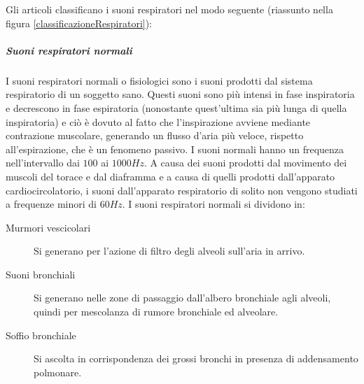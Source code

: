 Gli articoli \cite{ADT, KoronaKokar, kandaswamy, CACMVS} classificano i suoni respiratori nel modo seguente (riassunto nella figura \ref{classificazioneRespiratori}):
\subparagraph{Suoni respiratori normali}
    I suoni respiratori normali o fisiologici sono i suoni prodotti dal sistema respiratorio di un soggetto sano. 
    Questi suoni sono pi\`u intensi in fase inspiratoria e decrescono in fase espiratoria (nonostante quest'ultima sia pi\`u lunga di quella inspiratoria) e ci\`o \`e dovuto al fatto che l'inspirazione avviene mediante contrazione muscolare, generando un flusso d'aria pi\`u veloce, rispetto all'espirazione, che \`e un fenomeno passivo. 
    I suoni normali hanno un frequenza nell'intervallo dai $100$ ai $1000Hz$. 
    A causa dei suoni prodotti dal movimento dei muscoli del torace e dal diaframma e a causa di quelli prodotti dall'apparato cardiocircolatorio, i suoni dall'apparato respiratorio di solito non vengono studiati a frequenze minori di $60Hz$. 
    I suoni respiratori normali si dividono in:
    \begin{description}
      \item[Murmori vescicolari]
	Si generano per l'azione di filtro degli alveoli sull'aria in arrivo.
      \item[Suoni bronchiali]
	Si generano nelle zone di passaggio dall'albero bronchiale agli alveoli, quindi per mescolanza di rumore bronchiale ed alveolare. 
      \item[Soffio bronchiale]
	Si ascolta in corrispondenza dei grossi bronchi in presenza di addensamento polmonare.
    \end{description}
    

